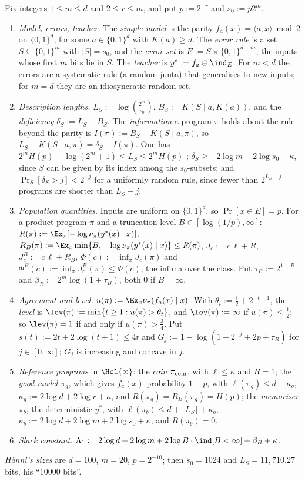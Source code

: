 \begin{definition}\label{def:teacher:instance}
Fix integers $1\le m\le d$ and $2\le r\le m$, and put $p:=2^{-r}$ and $s_0:=p2^m$.
\begin{enumerate}[label=(\alph*)]
\item \emph{Model, errors, teacher.} The \emph{simple model} is the parity $f_a(x)=\langle a,x\rangle\bmod2$ on $\{0,1\}^d$, for some $a\in\{0,1\}^d$ with $K(a)\ge d$. The \emph{error rule} is a set $S\subseteq\{0,1\}^m$ with $|S|=s_0$, and the \emph{error set} is $E:=S\times\{0,1\}^{d-m}$, the inputs whose first $m$ bits lie in $S$. The \emph{teacher} is $y^*:=f_a\oplus\ind_E$. For $m<d$ the errors are a systematic rule (a random junta) that generalises to new inputs; for $m=d$ they are an idiosyncratic random set.
\item \emph{Description lengths.} $L_S:=\log\binom{2^m}{s_0}$, $B_S:=K(S\mid a,K(a))$, and the \emph{deficiency} $\delta_S:=L_S-B_S$. The \emph{information} a program $\pi$ holds about the rule beyond the parity is $I(\pi):=B_S-K(S\mid a,\pi)$, so $L_S-K(S\mid a,\pi)=\delta_S+I(\pi)$. One has $2^mH(p)-\log(2^m+1)\le L_S\le2^mH(p)$ \citep{cover2006elements}; $\delta_S\ge-2\log m-2\log s_0-\kappa$, since $S$ can be given by its index among the $s_0$-subsets; and $\Pr_S[\delta_S>j]<2^{-j}$ for a uniformly random rule, since fewer than $2^{L_S-j}$ programs are shorter than $L_S-j$.
\item \emph{Population quantities.} Inputs are uniform on $\{0,1\}^d$, so $\Pr[x\in E]=p$. For a product program $\pi$ and a truncation level $B\in[\log(1/p),\infty]$: $R(\pi):=\Ex_x[-\log\nu_\pi(y^*(x)\mid x)]$, $R_B(\pi):=\Ex_x\min\{B,-\log\nu_\pi(y^*(x)\mid x)\}\le R(\pi)$, $J_c:=c\,\ell+R$, $J^B_c:=c\,\ell+R_B$, $\Phi(c):=\inf_\pi J_c(\pi)$ and $\Phi^B(c):=\inf_\pi J^B_c(\pi)\le\Phi(c)$, the infima over the class. Put $\tau_B:=2^{1-B}$ and $\beta_B:=2^m\log(1+\tau_B)$, both $0$ if $B=\infty$.
\item \emph{Agreement and level.} $u(\pi):=\Ex_x\nu_\pi(f_a(x)\mid x)$. With $\theta_t:=\frac12+2^{-t-1}$, the \emph{level} is $\lev(\pi):=\min\{t\ge1:u(\pi)>\theta_t\}$, and $\lev(\pi):=\infty$ if $u(\pi)\le\frac12$; so $\lev(\pi)=1$ if and only if $u(\pi)>\frac34$. Put $s(t):=2t+2\log(t+1)\le4t$ and $G_j:=1-\log(1+2^{-j}+2p+\tau_B)$ for $j\in[0,\infty]$; $G_j$ is increasing and concave in $j$.
\item \emph{Reference programs} in $\Hcl{\times}$: the \emph{coin} $\pi_{\rm coin}$, with $\ell\le\kappa$ and $R=1$; the \emph{good model} $\pi_g$, which gives $f_a(x)$ probability $1-p$, with $\ell(\pi_g)\le d+\kappa_g$, $\kappa_g:=2\log d+2\log r+\kappa$, and $R(\pi_g)=R_B(\pi_g)=H(p)$; the \emph{memoriser} $\pi_b$, the deterministic $y^*$, with $\ell(\pi_b)\le d+\lceil L_S\rceil+\kappa_b$, $\kappa_b:=2\log d+2\log m+2\log s_0+\kappa$, and $R(\pi_b)=0$.
\item \emph{Slack constant.} $\Lambda_1:=2\log d+2\log m+2\log B\cdot\ind[B<\infty]+\beta_B+\kappa$.
\end{enumerate}
\emph{H\"anni's sizes} are $d=100$, $m=20$, $p=2^{-10}$; then $s_0=1024$ and $L_S=11{,}710.27$ bits, his ``$10000$ bits''.
\end{definition}

